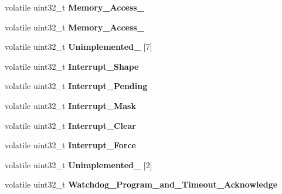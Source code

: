 \begin{DoxyCompactItemize}
\item 
\mbox{\label{structERC32__Register__Map_a412810f9e752ef273f4fd60d68d62a26}} 
volatile uint32\+\_\+t {\bfseries Memory\+\_\+\+Access\+\_}
\item 
\mbox{\label{structERC32__Register__Map_a0a496c8196e1c0159127c71750f64b73}} 
volatile uint32\+\_\+t {\bfseries Memory\+\_\+\+Access\+\_}
\item 
\mbox{\label{structERC32__Register__Map_a9ff04d8faadf5c70a24c5a8568adee8e}} 
volatile uint32\+\_\+t {\bfseries Unimplemented\+\_} \mbox{[}7\mbox{]}
\item 
\mbox{\label{structERC32__Register__Map_a87c80a5b0bc54033d09d0314c3757d30}} 
volatile uint32\+\_\+t {\bfseries Interrupt\+\_\+\+Shape}
\item 
\mbox{\label{structERC32__Register__Map_a6c6773fc9b9e066e5eda9c14dfdd5524}} 
volatile uint32\+\_\+t {\bfseries Interrupt\+\_\+\+Pending}
\item 
\mbox{\label{structERC32__Register__Map_a323b2d34719f243fc2d8ae582ddbfcdd}} 
volatile uint32\+\_\+t {\bfseries Interrupt\+\_\+\+Mask}
\item 
\mbox{\label{structERC32__Register__Map_aa48bc568115b31f50dacf0aa676037d0}} 
volatile uint32\+\_\+t {\bfseries Interrupt\+\_\+\+Clear}
\item 
\mbox{\label{structERC32__Register__Map_af8dd85501720bd1c4a44b97a41703afd}} 
volatile uint32\+\_\+t {\bfseries Interrupt\+\_\+\+Force}
\item 
\mbox{\label{structERC32__Register__Map_a08cd5051ff3a4a3b2d0b42b554ca9c00}} 
volatile uint32\+\_\+t {\bfseries Unimplemented\+\_} \mbox{[}2\mbox{]}
\item 
\mbox{\label{structERC32__Register__Map_a4675ff0ff5b279a77edd4e3c54f9f72e}} 
volatile uint32\+\_\+t {\bfseries Watchdog\+\_\+\+Program\+\_\+and\+\_\+\+Timeout\+\_\+\+Acknowledge}

\end{DoxyCompactItemize}
